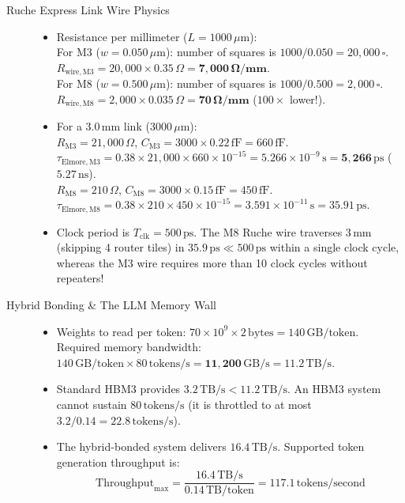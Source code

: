 \begin{description}
    \item[Ruche Express Link Wire Physics]
    \begin{itemize}
        \item Resistance per millimeter ($L = 1000\,\mu\mathrm{m}$): \\
        For M3 ($w = 0.050\,\mu\mathrm{m}$): number of squares is $1000 / 0.050 = 20{,}000\,\square$. \\
        $R_{\mathrm{wire, M3}} = 20{,}000 \times 0.35\,\Omega = \mathbf{7{,}000\,\Omega/mm}$. \\
        For M8 ($w = 0.500\,\mu\mathrm{m}$): number of squares is $1000 / 0.500 = 2{,}000\,\square$. \\
        $R_{\mathrm{wire, M8}} = 2{,}000 \times 0.035\,\Omega = \mathbf{70\,\Omega/mm}$ ($100\times$ lower!).
        \item For a $3.0\,\mathrm{mm}$ link ($3000\,\mu\mathrm{m}$): \\
        $R_{\mathrm{M3}} = 21{,}000\,\Omega$, $C_{\mathrm{M3}} = 3000 \times 0.22\,\mathrm{fF} = 660\,\mathrm{fF}$. \\
        $\tau_{\mathrm{Elmore, M3}} = 0.38 \times 21{,}000 \times 660 \times 10^{-15} = 5.266 \times 10^{-9}\,\mathrm{s} = \mathbf{5{,}266\,\mathrm{ps}}$ ($5.27\,\mathrm{ns}$). \\
        $R_{\mathrm{M8}} = 210\,\Omega$, $C_{\mathrm{M8}} = 3000 \times 0.15\,\mathrm{fF} = 450\,\mathrm{fF}$. \\
        $\tau_{\mathrm{Elmore, M8}} = 0.38 \times 210 \times 450 \times 10^{-15} = 3.591 \times 10^{-11}\,\mathrm{s} = \mathbf{35.91\,\mathrm{ps}}$.
        \item Clock period is $T_{\mathrm{clk}} = 500\,\mathrm{ps}$. The M8 Ruche wire traverses $3\,\mathrm{mm}$ (skipping 4 router tiles) in $35.9\,\mathrm{ps} \ll 500\,\mathrm{ps}$ within a single clock cycle, whereas the M3 wire requires more than 10 clock cycles without repeaters!
    \end{itemize}

    \item[Hybrid Bonding \& The LLM Memory Wall]
    \begin{itemize}
        \item Weights to read per token: $70 \times 10^9 \times 2\,\mathrm{bytes} = 140\,\mathrm{GB/token}$. \\
        Required memory bandwidth: $140\,\mathrm{GB/token} \times 80\,\mathrm{tokens/s} = \mathbf{11{,}200\,\mathrm{GB/s}} = \mathbf{11.2\,\mathrm{TB/s}}$.
        \item Standard HBM3 provides $3.2\,\mathrm{TB/s} < 11.2\,\mathrm{TB/s}$. An HBM3 system cannot sustain $80\,\mathrm{tokens/s}$ (it is throttled to at most $3.2 / 0.14 = \mathbf{22.8\,\mathrm{tokens/s}}$).
        \item The hybrid-bonded system delivers $16.4\,\mathrm{TB/s}$. Supported token generation throughput is:
        \begin{equation*}
        \mathrm{Throughput}_{\max} = \frac{16.4\,\mathrm{TB/s}}{0.14\,\mathrm{TB/token}} = \mathbf{117.1\,\mathrm{tokens/second}}
        \end{equation*}
    \end{itemize}


\end{description}
